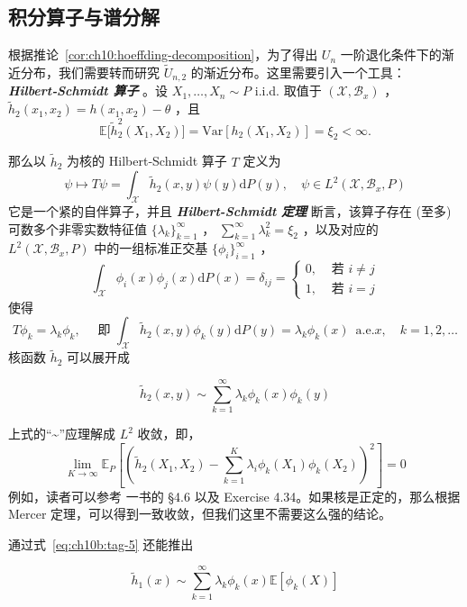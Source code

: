 \subsection{积分算子与谱分解}

根据推论~\ref{cor:ch10:hoeffding-decomposition}，为了得出 $U_n$ 一阶退化条件下的渐近分布，我们需要转而研究 $\widetilde U_{n,2}$ 的渐近分布。这里需要引入一个工具：\textbf{\emph{Hilbert‑Schmidt 算子}} 。设 $X_1,\dots,X_n\sim P$ i.i.d. 取值于 $(\mathscr X,\mathscr B_x)$ ， $\widetilde h_2(x_1,x_2)=h(x_1,x_2)-\theta$ ，且
\[
\mathbb E\big[\widetilde h^2_2(X_1,X_2)]=\mathrm{Var}[h_2(X_1,X_2)]=\xi_2<\infty.
\]

那么以 $\widetilde h_2$ 为核的 Hilbert‑Schmidt 算子 $T$ 定义为
\[\psi\mapsto T\psi= \int_{\mathscr X}\widetilde h_2(x,y)\psi (y)\mathrm dP(y),\quad \psi\in L^2(\mathscr X,\mathscr B_x,P)\]
它是一个紧的自伴算子，并且 \textbf{\emph{Hilbert-Schmidt 定理}} 断言，该算子存在 (至多) 可数多个非零实数特征值 $\{\lambda_k\}_{k=1}^\infty$ ， $\textstyle\sum_{k=1}^\infty\lambda^2_k=\xi_2$ ，以及对应的 $L^2(\mathscr X,\mathscr B_x,P)$ 中的一组标准正交基 $\{\phi_i\}_{i=1}^\infty$ ，
\[\int_{\mathscr X}\phi_i(x)\phi_j(x)\mathrm dP(x)=\delta_{ij}=\begin{cases}0,&\text{ 若 }i\ne j\\1,&\text { 若 }i=j\end{cases}\]
使得
\[T\phi_k=\lambda_k\phi_k,\quad \text{ 即 }\int_{\mathscr X}\widetilde h_2(x,y)\phi_k(y)\mathrm dP(y)=\lambda_k\phi_k(x)\enspace \text{a.e.}x,\quad k=1,2,\dots\]
核函数 $\widetilde h_2$ 可以展开成

\begin{equation}
\label{eq:ch10b:tag-5}
\widetilde h_2(x,y)\sim\sum_{k=1}^\infty\lambda_k\phi_k(x)\phi_k(y)
\end{equation}

上式的``\textasciitilde{}''应理解成 $L^2$ 收敛，即，
\[\lim_{K\to\infty}\mathbb E_P\left[\left(\widetilde h_2(X_1,X_2)-\sum_{k=1}^K\lambda_i\phi_k(X_1)\phi_k(X_2)\right)^2\right]=0\]
例如，读者可以参考 \cite{steinshakarchi2009} 一书的 §4.6 以及 Exercise 4.34。如果核是正定的，那么根据 Mercer 定理，可以得到一致收敛，但我们这里不需要这么强的结论。

通过式~\eqref{eq:ch10b:tag-5} 还能推出

\begin{equation}
\label{eq:ch10b:tag-6}
\widetilde h_1(x)\sim\sum_{k=1}^\infty\lambda_k\phi_k(x)\mathbb E[\phi_k(X)]
\end{equation}

